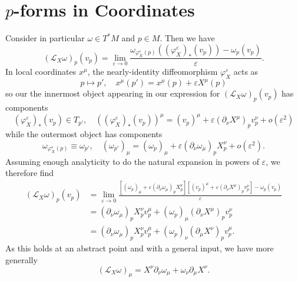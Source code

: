 \documentclass[11pt,letterpaper]{article}
\newcommand{\LP}{\left(}
\newcommand{\RP}{\right)}
\newcommand{\mc}[1]{\mathcal{#1}}
\newcommand{\D}{\partial}
\begin{document}
\section{$p$-forms in Coordinates}
Consider in particular $\omega \in T^* M$ and $p \in M$. Then we have \begin{equation}
\LP \mc{L}_X \omega \RP_p \LP v_p \RP = \lim_{\varepsilon \to 0} \frac{ \omega_{\varphi^\varepsilon_X (p)} \LP \LP \varphi^\varepsilon_X \RP_* \LP v_p \RP \RP - \omega_p \LP v_p \RP}{\varepsilon}.
\end{equation}
In local coordinates $x^\mu$, the nearly-identity diffeomorphism $\varphi_X^\varepsilon$ acts as \begin{equation}
p \mapsto p', \quad x^\mu(p') = x^\mu (p) + \varepsilon X^\mu(p)
\end{equation}
so our the innermost object appearing in our expression for $\LP \mc{L}_X \omega \RP_p \LP v_p \RP$ has components \begin{equation}
\LP \varphi^\varepsilon_X \RP_* \LP v_p \RP \in T_{p'}, \quad \LP \LP \varphi^\varepsilon_X \RP_* \LP v_p \RP \RP^\mu = (v_p)^\mu + \varepsilon \LP \D_\nu X^\mu \RP_p v_p^\nu  + o \LP \varepsilon^2 \RP
\end{equation}
while the outermost object has components \begin{equation}
\omega_{\varphi^\varepsilon_X (p)} \equiv \omega_{p'}, \quad \LP \omega_{p'} \RP_\mu = \LP \omega_p \RP_\mu + \varepsilon \LP \D_\nu \omega_\mu \RP_p X_p^\nu + o \LP \varepsilon^2 \RP.
\end{equation}
Assuming enough analyticity to do the natural expansion in powers of $\varepsilon$, we therefore find \begin{equation}
\begin{aligned}
\LP \mc{L}_X \omega \RP_p \LP v_p \RP & = \lim_{\varepsilon \to 0} \frac{ \left[ \LP \omega_p \RP_\mu + \varepsilon \LP \D_\nu \omega_\mu \RP_p X_p^\nu  \right] \left[ (v_p)^\mu + \varepsilon \LP \D_\nu X^\mu \RP_p v_p^\nu \right] - \omega_p \LP v_p \RP}{\varepsilon} \\
& = \LP \D_\nu \omega_\mu \RP_p X_p^\nu v_p^\mu + \LP \omega_p \RP_\mu \LP \D_\nu X^\mu \RP_p v_p^\nu \\
& = \LP \D_\nu \omega_\mu \RP_p X_p^\nu v_p^\mu + \LP \omega_p \RP_\nu \LP \D_\mu X^\nu \RP_p v_p^\mu.
\end{aligned}
\end{equation}
As this holds at an abstract point and with a general input, we have more generally \begin{equation}
\LP \mc{L}_X \omega \RP_\mu = X^\nu \D_\nu \omega_\mu + \omega_\nu \D_\mu X^\nu .
\end{equation}
\end{document}
